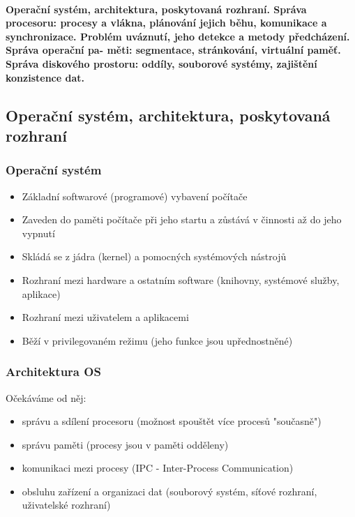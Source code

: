 \documentclass[10pt,a4paper]{article}
\begin{document}
\paragraph{Operační systém, architektura, poskytovaná rozhraní. Správa procesoru: procesy a vlákna, plánování jejich
běhu, komunikace a synchronizace. Problém uváznutí, jeho detekce a metody předcházení. Správa operační pa-
měti: segmentace, stránkování, virtuální paměť. Správa diskového prostoru: oddíly, souborové systémy, zajištění
konzistence dat.}


\subsection{Operační systém, architektura, poskytovaná rozhraní}

\subsubsection{Operační systém}
\begin{itemize}
	\item Základní softwarové (programové) vybavení počítače
	\item Zaveden do paměti počítače při jeho startu a zůstává v činnosti až do jeho vypnutí
	\item Skládá se z jádra (kernel) a pomocných systémových nástrojů
	\item Rozhraní mezi hardware a ostatním software (knihovny, systémové služby, aplikace)
	\item Rozhraní mezi uživatelem a aplikacemi
	\item Běží v privilegovaném režimu (jeho funkce jsou upřednostněné)
\end{itemize}

\subsubsection{Architektura OS}
Očekáváme od něj:
\begin{itemize}
	\item správu a sdílení procesoru (možnost spouštět více procesů "současně")
	\item správu paměti (procesy jsou v paměti odděleny)
	\item komunikaci mezi procesy (IPC - Inter-Process Communication)
	\item obsluhu zařízení a organizaci dat (souborový systém, síťové rozhraní, uživatelské rozhraní)
\end{itemize}
\end{document}
